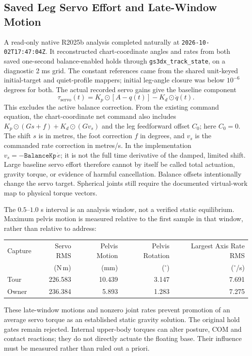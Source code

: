 \documentclass[11pt,a4paper]{article}
\begin{document}
\subsection{Saved Leg Servo Effort and Late-Window Motion}
A read-only native R2025b analysis completed naturally at
\texttt{2026-10-02T17:47:04Z}. It reconstructed chart-coordinate angles
and rates from both saved one-second balance-enabled holds through
\texttt{gs3dx\_track\_state}, on a diagnostic 2 ms grid. The constant
references came from the shared unit-keyed initial-target and quiet-profile
mappers; initial leg-angle closure was below $10^{-6}$ degrees for both.
The actual recorded servo gains give the baseline component
\begin{equation}
 \tau_{\mathrm{servo}}(t)=K_p\odot[A-q(t)]-K_d\odot\dot q(t).
\end{equation}
This excludes the active balance correction. From the existing command
equation, the chart-coordinate net command also includes
$K_p\odot(Gs+f)+K_d\odot(Gv_s)$ and the leg feedforward offset $C_0$;
here $C_0=0$. The shift $s$ is in metres, the foot correction $f$ in
degrees, and $v_s$ is the commanded rate correction in metres/s. In the
implementation $v_s=-\mathtt{BalanceKp}\,\dot e$; it is not the full
time derivative of the damped, limited shift. Large baseline servo effort
therefore cannot by itself be
called total actuation, gravity torque, or evidence of harmful cancellation.
Balance offsets intentionally change the servo target. Spherical joints
still require the documented virtual-work map to physical torque vectors.

The $0.5$--$1.0$ s interval is an analysis window, not a verified static
equilibrium. Maximum pelvis motion is measured relative to the first
sample in that window, rather than relative to address:
\begin{center}
\begin{tabular}{lrrrr}
\toprule
Capture & Servo RMS & Pelvis Motion & Pelvis Rotation & Largest Axis Rate RMS \\
 & (N\,m) & (mm) & ($^\circ$) & ($^\circ$/s) \\
\midrule
Tour & 226.583 & 10.439 & 3.147 & 7.691 \\
Owner & 236.384 & 5.893 & 1.283 & 7.275 \\
\bottomrule
\end{tabular}
\end{center}
These late-window motions and nonzero joint rates prevent promotion of an
average servo torque as an established static gravity solution. The original
hold gates remain rejected. Internal upper-body torques can alter posture,
COM and contact reactions; they do not directly actuate the floating base.
Their influence must be measured rather than ruled out a priori.
\end{document}
